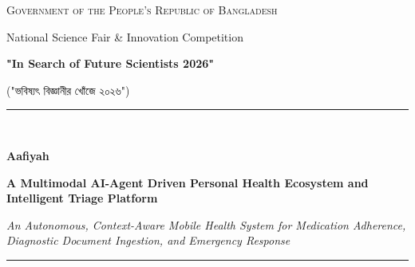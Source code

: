 \documentclass[12pt,a4paper,oneside]{report}
\begin{document}
\begin{titlepage}
    \begin{tcolorbox}[
        enhanced,
        colback=white,
        colframe=deepEmerald,
        arc=0mm,
        boxrule=2.2pt,
        height=\textheight,
        left=20pt,
        right=20pt,
        top=25pt,
        bottom=25pt
    ]
    \centering
    
    \vspace*{0.2cm}
    {\scshape\Large Government of the People's Republic of Bangladesh \par}
    \vspace{0.1cm}
    {\large National Science Fair \& Innovation Competition \par}
    \vspace{0.4cm}
    {\Huge\bfseries\textcolor{accentCoral}{"In Search of Future Scientists 2026"}\par}
    \vspace{0.1cm}
    {\large ("ভবিষ্যৎ বিজ্ঞানীর খোঁজে ২০২৬") \par}
    
    \vspace{1.0cm}
    \rule{\linewidth}{1.6pt}\\[0.4cm]
    {\Huge\bfseries\textcolor{deepEmerald}{Aafiyah}\par}
    \vspace{0.3cm}
    {\Large\bfseries A Multimodal AI-Agent Driven Personal Health Ecosystem and Intelligent Triage Platform\par}
    \vspace{0.2cm}
    {\normalsize\textit{An Autonomous, Context-Aware Mobile Health System for Medication Adherence, Diagnostic Document Ingestion, and Emergency Response}\par}
    \rule{\linewidth}{1.6pt}
    

\end{tcolorbox}
\end{titlepage}
\end{document}
